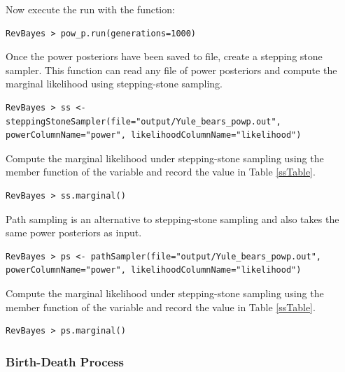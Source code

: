 Now execute the run with the  function:
{\tt \begin{snugshade*}
\begin{lstlisting}
RevBayes > pow_p.run(generations=1000)  
\end{lstlisting}
\end{snugshade*}}

Once the power posteriors have been saved to file, create a stepping stone sampler. This function can read any file of power posteriors and compute the marginal likelihood using stepping-stone sampling. 
{\tt \small \begin{snugshade*}
\begin{lstlisting}
RevBayes > ss <- steppingStoneSampler(file="output/Yule_bears_powp.out", powerColumnName="power", likelihoodColumnName="likelihood")
\end{lstlisting}
\end{snugshade*}}

Compute the marginal likelihood under stepping-stone sampling using the member function  of the  variable and record the value in Table \ref{ssTable}.
{\tt \begin{snugshade*}
\begin{lstlisting}
RevBayes > ss.marginal() 
\end{lstlisting}
\end{snugshade*}}

Path sampling is an alternative to stepping-stone sampling and also takes the same power posteriors as input. 
{\tt \small \begin{snugshade*}
\begin{lstlisting}
RevBayes > ps <- pathSampler(file="output/Yule_bears_powp.out", powerColumnName="power", likelihoodColumnName="likelihood")
\end{lstlisting}
\end{snugshade*}}

Compute the marginal likelihood under stepping-stone sampling using the member function  of the  variable and record the value in Table \ref{ssTable}.
{\tt \begin{snugshade*}
\begin{lstlisting}
RevBayes > ps.marginal() 
\end{lstlisting}
\end{snugshade*}}

\bigskip
\subsubsection{Birth-Death Process}\label{birthDeathSec}

